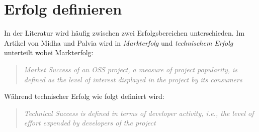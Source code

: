\section{Erfolg definieren}







\noindent
In der Literatur wird häufig zwischen zwei Erfolgsbereichen unterschieden.
Im Artikel von Midha und Palvia \cite{midhaFactorsAffectingSuccess2012} %
wird in \textit{Markterfolg} und \textit{technischem Erfolg} unterteilt
wobei Markterfolg:

\begin{quote}
    \textit{
        \textcolor{gray}{
            Market Success of an OSS project, a measure of project popularity, is defined as the
            level of interest displayed in the project by its consumers
        }
    }
\end{quote}

\noindent
Während technischer Erfolg wie folgt definiert wird:

\begin{quote}
    \textit{
        \textcolor{gray}{
            Technical Success is defined in terms of developer activity, i.e.,
            the level of effort expended by developers of the project
        }
    }
\end{quote}

